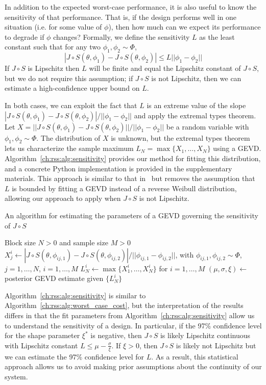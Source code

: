 In addition to the expected worst-case performance, it is also useful to know the sensitivity of that performance. That is, if the design performs well in one situation (i.e. for some value of $\phi$), then how much can we expect its performance to degrade if $\phi$ changes? Formally, we define the sensitivity $L$ as the least constant such that for any two $\phi_1, \phi_2 \sim \Phi$, $$|J\circ S(\theta, \phi_1) - J\circ S(\theta, \phi_2)| \leq L ||\phi_1 - \phi_2||$$
If $J \circ S$ is Lipschitz then $L$ will be finite and equal the Lipschitz constant of $J \circ S$, but we do not require this assumption; if $J \circ S$ is not Lipschitz, then we can estimate a high-confidence upper bound on $L$.

In both cases, we can exploit the fact that $L$ is an extreme value of the slope $|J\circ S(\theta, \phi_1) - J\circ S(\theta, \phi_2)| / ||\phi_1 - \phi_2||$ and apply the extremal types theorem. Let $X = ||J\circ S(\theta, \phi_1) - J\circ S(\theta, \phi_2)|| / ||\phi_1 - \phi_2||$ be a random variable with $\phi_1, \phi_2 \sim \Phi$. The distribution of $X$ is unknown, but the extremal types theorem lets us characterize the sample maximum $L_N = \max\{X_1, \ldots, X_N\}$ using a GEVD. Algorithm~\ref{ch:rss:alg:sensitivity} provides our method for fitting this distribution, and a concrete Python implementation is provided in the supplementary materials. This approach is similar to that in~\cite{sridhar2021improving,knuthPlanningLearnedDynamics2021} but removes the assumption that $L$ is bounded by fitting a GEVD instead of a reverse Weibull distribution, allowing our approach to apply when $J\circ S$ is not Lipschitz.
\begin{algorithm}
    \caption{An algorithm for estimating the parameters of a GEVD governing the sensitivity of $J \circ S$}\label{ch:rss:alg:sensitivity}
    \begin{algorithmic}
        \Require Block size $N > 0$ and sample size $M > 0$
        \State $X_j^i \gets |J\circ S(\theta, \phi_{ij,1}) - J\circ S(\theta, \phi_{ij,2})| / ||\phi_{ij,1} - \phi_{ij,2}||$, \hspace{2cm} \phantom{xxxxxxx} with $\phi_{ij,1}, \phi_{ij,2} \sim\Phi$, $j=1,\ldots,N$, $i=1,\ldots,M$
        \State $L_N^i \gets \max\{X_1^i, \ldots, X_N^i\}$ for $i=1,\ldots,M$
        \State $(\mu, \sigma, \xi) \gets$ posterior GEVD estimate given $\{L_N^i\}$
    \end{algorithmic}
\end{algorithm}

Algorithm~\ref{ch:rss:alg:sensitivity} is similar to Algorithm~\ref{ch:rss:alg:worst_case_cost}, but the interpretation of the results differs in that the fit parameters from Algorithm~\ref{ch:rss:alg:sensitivity} allow us to understand the sensitivity of a design. In particular, if the 97\% confidence level for the shape parameter $\xi^*$ is negative, then $J\circ S$ is likely Lipschitz continuous with Lipschitz constant $L \leq \mu - \frac{\sigma}{\xi}$. If $\xi > 0$, then $J\circ S$ is likely not Lipschitz but we can estimate the 97\% confidence level for $L$. As a result, this statistical approach allows us to avoid making prior assumptions about the continuity of our system.

